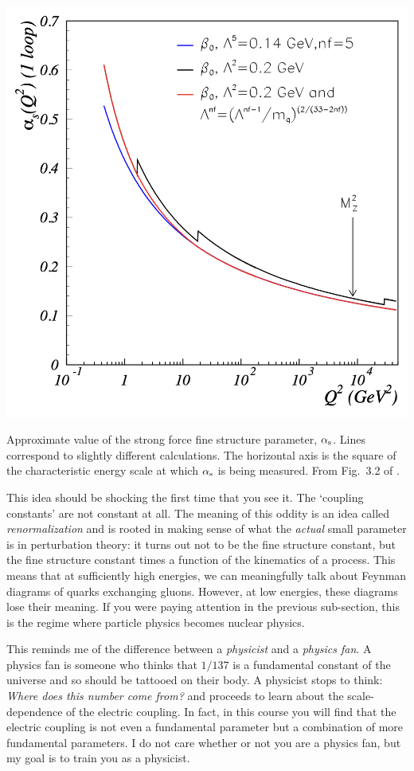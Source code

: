 \documentclass[12pt, oneside]{report}    %
\begin{document}
\begin{marginfigure}%
    \includegraphics[width=.8\textwidth]{figures/aSrun_1604.08082.png}
    \caption{Approximate value of the strong force fine structure parameter, $\alpha_\textnormal{s}$. Lines correspond to slightly different calculations. The horizontal axis is the square of the characteristic energy scale at which $\alpha_\textnormal{s}$ is being measured. From Fig.~3.2 of .}
    \label{fig:aS:running:from:1604.08082}
\end{marginfigure}
This idea should be shocking the first time that you see it. The `coupling constants' are not constant at all. The meaning of this oddity is an idea called \emph{renormalization} and is rooted in making sense of what the \emph{actual} small parameter is in perturbation theory: it turns out not to be the fine structure constant, but the fine structure constant times a function of the kinematics of a process. This means that at sufficiently high energies, we can meaningfully talk about Feynman diagrams of quarks exchanging gluons. However, at low energies, these diagrams lose their meaning. If you were paying attention in the previous sub-section, this is the regime where particle physics becomes nuclear physics.
\begin{example}
This reminds me of the difference between a \emph{physicist} and a \emph{physics fan}. A physics fan is someone who thinks that $1/137$ is a fundamental constant of the universe and so should be tattooed on their body. A physicist stops to think: \emph{Where does this number come from?} and proceeds to learn about the scale-dependence of the electric coupling. In fact, in this course you will find that the electric coupling is not even a fundamental parameter but a combination of more fundamental parameters. I do not care whether or not you are a physics fan, but my goal is to train you as a physicist.
\end{example}
\end{document}
